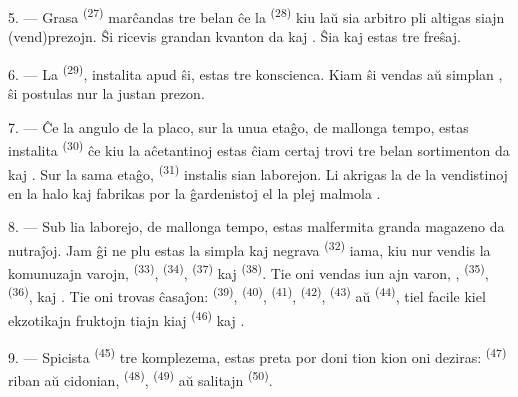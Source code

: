 5. --- Grasa  \textsuperscript{(27)} marĉandas tre belan
 ĉe la  \textsuperscript{(28)} kiu laŭ sia
arbitro pli altigas siajn (vend)prezojn. Ŝi ricevis grandan kvanton da
 kaj . Ŝia  kaj
 estas tre freŝaj.

\VUsaut{4.0mm}
\VUsaut{3.0mm}

6. --- La  \textsuperscript{(29)}, instalita apud ŝi,
estas tre konscienca. Kiam ŝi vendas  aŭ
simplan , ŝi postulas nur la justan prezon.

7. --- Ĉe la angulo de la placo, sur la unua etaĝo, de mallonga tempo, estas
instalita  \textsuperscript{(30)} ĉe kiu la aĉetantinoj
estas ĉiam certaj trovi tre belan sortimenton da  kaj . Sur la sama etaĝo,
 \textsuperscript{(31)} instalis sian laborejon. Li akrigas
la  de la vendistinoj en la halo kaj fabrikas por la
ĝardenistoj  el la plej malmola .

\VUsaut{4.0mm}
\VUsaut{3.0mm}

8. --- Sub lia laborejo, de mallonga tempo, estas malfermita granda magazeno da
nutraĵoj. Jam ĝi ne plu estas la simpla kaj negrava 
\textsuperscript{(32)} iama, kiu nur vendis la komunuzajn varojn, 
\textsuperscript{(33)},  \textsuperscript{(34)},
 \textsuperscript{(37)} kaj 
\textsuperscript{(38)}. Tie oni vendas iun ajn varon, ,  \textsuperscript{(35)}, 
\textsuperscript{(36)},  kaj
. Tie oni trovas ĉasaĵon: 
\textsuperscript{(39)},  \textsuperscript{(40)},
 \textsuperscript{(41)}, 
\textsuperscript{(42)},  \textsuperscript{(43)} aŭ
 \textsuperscript{(44)}, tiel facile kiel ekzotikajn fruktojn
tiajn kiaj  \textsuperscript{(46)} kaj .

9. --- Spicista  \textsuperscript{(45)} tre komplezema,
estas preta por doni tion kion oni deziras: 
\textsuperscript{(47)} riban aŭ cidonian,  \textsuperscript{(48)},
 \textsuperscript{(49)} aŭ salitajn 
\textsuperscript{(50)}.

